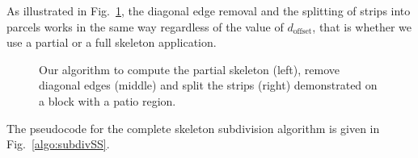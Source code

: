 As illustrated in Fig.~\ref{fig:forPerim}, the diagonal edge removal and the splitting of strips into parcels works in the same way regardless of the value of $d_{\text{offset}}$, that is whether we use a partial or a full skeleton application. 

\begin{figure}
\centering
\def\svgwidth{1.0\columnwidth}

\caption[Assignment in a perimeter subdivision]{\label{fig:forPerim}Our algorithm to compute the partial skeleton (left), remove diagonal edges (middle) and split the strips (right) demonstrated on a block with a patio region.}
\end{figure}

The pseudocode for the complete skeleton subdivision algorithm is given in Fig.~\ref{algo:subdivSS}.


